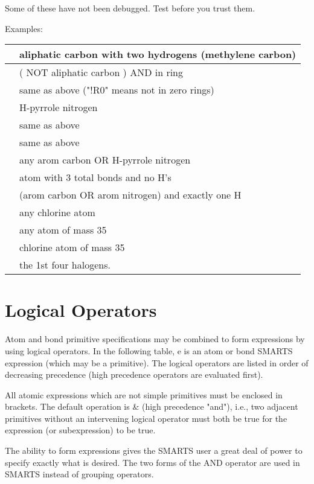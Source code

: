 \begin{itemize}
Some of these have not been debugged. Test before you trust them.

Examples: \par
\begin{tabular}{| l | l |}
\hline
  [CH2] & aliphatic carbon with two hydrogens (methylene carbon) \\ \hline
  [!C;R] & ( NOT aliphatic carbon ) AND in ring \\ \hline
  [!C;!R0] & same as above ("!R0" means not in zero rings) \\ \hline
  [n;H1] & H-pyrrole nitrogen \\ \hline
  [n\&H1] & same as above \\ \hline
  [nH1] & same as above \\ \hline
  [c,n\&H1] & any arom carbon OR H-pyrrole nitrogen \\ \hline
  [X3\&H0] & atom with 3 total bonds and no H's \\ \hline
  [c,n;H1] & (arom carbon OR arom nitrogen)  and exactly one H \\ \hline
  [Cl] & any chlorine atom \\ \hline
  [35*] & any atom of mass 35 \\ \hline
  [35Cl] & chlorine atom of mass 35 \\ \hline
  [F,Cl,Br,I] & the 1st four halogens. \\ \hline
\end{tabular}

\section{Logical Operators}

 Atom and bond primitive specifications may be combined to form expressions by using logical operators. In the following table, e is an atom or bond SMARTS expression (which may be a primitive). The logical operators are listed in order of decreasing precedence (high precedence operators are evaluated first).

All atomic expressions which are not simple primitives must be enclosed in brackets. The default operation is \& (high precedence "and"), i.e., two adjacent primitives without an intervening logical operator must both be true for the expression (or subexpression) to be true.

The ability to form expressions gives the SMARTS user a great deal of power to specify exactly what is desired. The two forms of the AND operator are used in SMARTS instead of grouping operators.


\end{itemize}
